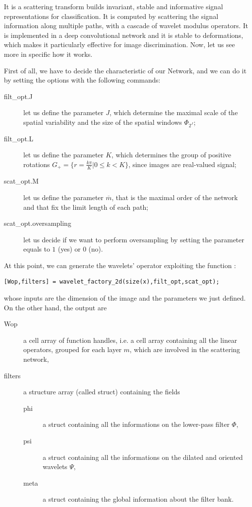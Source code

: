 \documentclass[12pt,a4paper]{article}
\theoremstyle{remark}
\begin{document}
It is a scattering transform builds invariant, stable and informative signal representations for classification. It is computed by scattering the signal information along multiple paths, with a cascade of wavelet modulus operators. It is implemented in a deep convolutional network and it is stable to deformations, which makes it particularly effective for image discrimination. Now, let us see more in specific how it works.

First of all, we have to decide the characteristic of our Network, and we can do it by setting the options with the following commands:
\begin{description}
	\item[filt\_opt.J] let us define the parameter $J$, which determine the maximal scale of the spatial variability and the size of the spatial windows $\Phi_{2^J}$;
	\item[filt\_opt.L] let us define the parameter $K$, which determines the group of positive rotations $G_{+}= \{ r = \frac{k\pi}{K} | 0\leq k < K \}$, since images are real-valued signal;
	\item[scat\_opt.M] let us define the parameter $\overline{m}$, that is the maximal order of the network and that fix the limit length of each path;
	\item[scat\_opt.oversampling] let us decide if we want to perform oversampling by setting the parameter equals to $1$ (yes) or $0$ (no).
\end{description}

At this point, we can generate the wavelets' operator exploiting the function :
\begin{lstlisting}
[Wop,filters] = wavelet_factory_2d(size(x),filt_opt,scat_opt); 
\end{lstlisting}
whose inputs are the dimension of the image and the parameters we just defined. On the other hand, the output are
\begin{description}
	\item[Wop] a cell array of function handles, i.e. a cell array containing all the linear operators, grouped for each layer $m$, which are involved in the scattering network,	
	\item[filters]  a structure array (called struct) containing the fields
	\begin{description}
		\item[phi] a struct containing all the informations on the lower-pass filter $\Phi$,
		\item[psi] a struct containing all the informations on the dilated and oriented wavelets $\Psi$,
		\item[meta]a struct containing the global information about the filter bank.
	\end{description}
\end{description}
\end{document}
